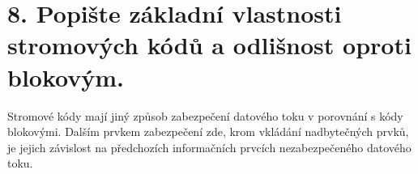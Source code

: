 \section{8. Popište základní vlastnosti stromových kódů a odlišnost oproti blokovým.}
Stromové kódy mají jiný způsob zabezpečení datového toku v porovnání s kódy blokovými. Dalším prvkem zabezpečení zde, krom vkládání nadbytečných prvků, je jejich závislost na předchozích informačních prvcích nezabezpečeného datového toku.
